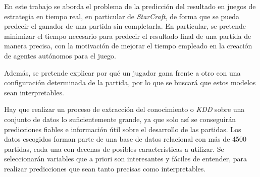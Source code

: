 
En este trabajo se aborda el problema de la predicción del resultado en
juegos de estrategia en tiempo real, en particular de \emph{StarCraft}, de
forma que se pueda predecir el ganador de una partida sin completarla.
En particular, se pretende minimizar el tiempo necesario para predecir el
resultado final de una partida de manera precisa, con la motivación
de mejorar el tiempo empleado en la creación de agentes autónomos para el juego.

Además, se pretende explicar
por qué un jugador gana frente a otro con una configuración determinada de la
partida, por lo que se buscará que estos modelos sean interpretables.

Hay que realizar un proceso de extracción del
conocimiento o \emph{KDD} sobre una conjunto de datos lo suficientemente
grande, ya que solo así se conseguirán predicciones fiables e información útil
sobre el desarrollo de las partidas. Los datos escogidos forman parte de una
base de datos relacional con más de 4500 partidas, cada una con decenas de posibles
características a utilizar. Se seleccionarán variables que a priori son
interesantes y fáciles de entender, para realizar predicciones que sean tanto
precisas como interpretables.

